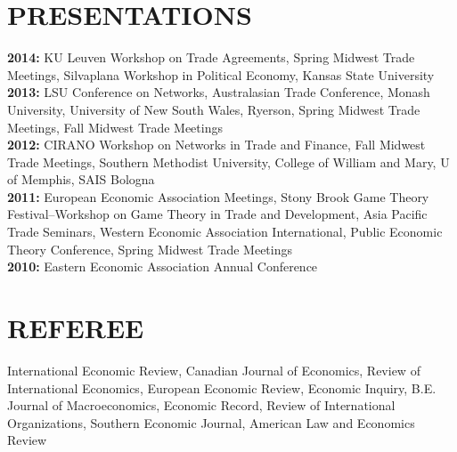\documentclass[11pt]{res}
\begin{document}
\begin{resume}
\section{PRESENTATIONS}\vspace{2mm}
{\bf 2014:} KU Leuven Workshop on Trade Agreements, Spring Midwest Trade Meetings, Silvaplana Workshop in Political Economy, Kansas State University\vspace{2mm}\\
{\bf 2013:} LSU Conference on Networks, Australasian Trade Conference, Monash University, University of New South Wales, Ryerson, Spring Midwest Trade Meetings, Fall Midwest Trade Meetings\vspace{2mm}\\
{\bf 2012:}  CIRANO Workshop on Networks in Trade and Finance, Fall Midwest Trade Meetings, Southern Methodist University, College of William and Mary, U of Memphis, SAIS Bologna\vspace{2mm}\\
{\bf 2011:} European Economic Association Meetings, Stony Brook Game Theory Festival--Workshop on Game Theory in Trade and Development, Asia Pacific Trade Seminars, Western Economic Association International, Public Economic Theory Conference, Spring Midwest Trade Meetings\vspace{2mm}\\
 {\bf 2010:} Eastern Economic Association Annual Conference \vspace{2mm}\\

\section{REFEREE} \vspace{3mm}

International Economic Review, Canadian Journal of Economics, Review of International Economics, European Economic Review, Economic Inquiry, B.E. Journal of Macroeconomics, Economic Record, Review of International Organizations, Southern Economic Journal, American Law and Economics Review\\


\newpage
\phantom{.}\vspace{.4cm}


\end{resume}
\end{document}
